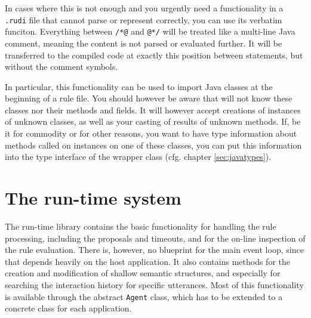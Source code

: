 %
In cases where this is not enough and you urgently need a functionality in a \texttt{.rudi} file that \vonda cannot parse or represent correctly, you can use its verbatim funciton. Everything between \verb|/*@| and \verb|@*/| will be treated like a multi-line Java comment, meaning the content is not parsed or evaluated further. It will be transferred to the compiled code at exactly this position between statements, but without the comment symbols. 


In particular, this functionality can be used to import Java classes at the beginning of a rule file. You should however be aware that \vonda will not know these classes nor their methods and fields. It will however accept creations of instances of unknown classes, as well as your casting of results of unknown methods. If, be it for commodity or for other reasons, you want \vonda to have type information about methods called on instances on one of these classes, you can put this information into the type interface of the wrapper class (cfg. chapter \ref{sec:javatypes}).

\section{The run-time system}

The run-time library contains the basic functionality for handling the rule
processing, including the proposals and timeouts, and for the on-line
inspection of the rule evaluation. There is, however, no blueprint for the main
event loop, since that depends heavily on the host application. It also
contains methods for the creation and modification of shallow semantic
structures, and especially for searching the interaction history for specific
utterances. Most of this functionality is available through the abstract
\texttt{Agent} class, which has to be extended to a concrete class for each
application.

